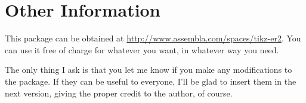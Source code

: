 \documentclass[12pt]{article}
\begin{document}
\section{Other Information}
\label{sec:other-information}

This package can be obtained at
\url{http://www.assembla.com/spaces/tikz-er2}. You can use it
free of charge for whatever you want, in whatever way you need.

The only thing I ask is that you let me know if you make any modifications to
the package. If they can be useful to everyone, I'll be glad to insert them in
the next version, giving the proper credit to the author, of course.

\newpage

\appendix
\end{document}
